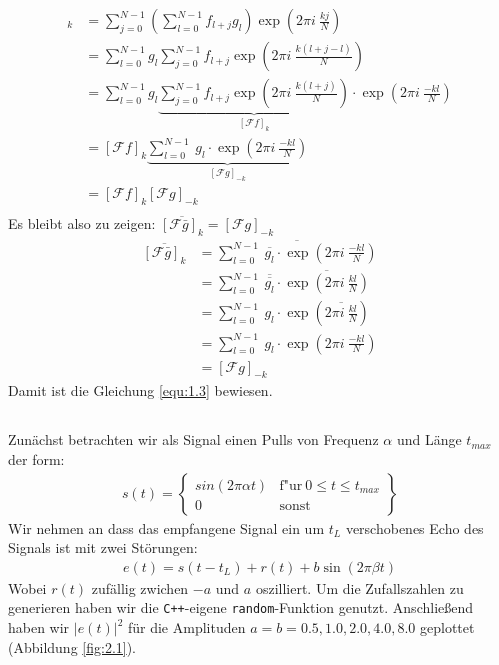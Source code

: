 \documentclass[ngerman]{scrartcl}
\begin{document}
\begin{align*}
	[\mathcal{F}(f \odot g)]_{k}
	&= \sum_{j=0}^{N-1} \left( \sum_{l=0}^{N-1} f_{l+j} g_{l} \right)  \exp (2 \pi i ~\frac{kj}{N})\\
	&= \sum_{l=0}^{N-1} g_l \sum_{j=0}^{N-1} f_{l+j} \exp (2 \pi i ~\frac{k(l+j-l)}{N})\\
	&= \sum_{l=0}^{N-1} g_l \underbrace{\sum_{j=0}^{N-1} f_{l+j} \exp (2 \pi i ~\frac{k(l+j)}{N})}_{[\mathcal{F} f]_{k}} \cdot \exp (2 \pi i ~\frac{-kl}{N})\\
	&= [\mathcal{F} f]_{k} \underbrace{\sum_{l=0}^{N-1} ~ g_l \cdot \exp (2 \pi i ~\frac{-kl}{N})}_{[\mathcal{F} g]_{-k}}\\
	&= [\mathcal{F} f]_{k} [\mathcal{F} g]_{-k}\\
\end{align*}
Es bleibt also zu zeigen:
$\overline{[\mathcal{F} \bar{g}]_{k}}=[\mathcal{F} g]_{-k}$
\begin{align*}
	\overline{[\mathcal{F} \bar{g}]_{k}} &=\overline{\sum_{l=0}^{N-1} ~ \overline{g_l} \cdot \exp (2 \pi i ~\frac{-kl}{N})}\\
	&= \sum_{l=0}^{N-1} ~ \overline{\overline{g_l}} \cdot \overline{\exp (2 \pi i ~\frac{kl}{N})}\\
	&= \sum_{l=0}^{N-1} ~ g_l \cdot \exp (\overline{2 \pi i ~\frac{kl}{N}})\\
	&= \sum_{l=0}^{N-1} ~ g_l \cdot \exp (2 \pi i ~\frac{-kl}{N})\\
	&=[\mathcal{F} g]_{-k}
\end{align*}
Damit ist die Gleichung \ref{equ:1.3} bewiesen.
\subsection{}
\label{ssec:10.2}
Zunächst betrachten wir als Signal einen Pulls
von Frequenz $\alpha$ und L\"ange $t_{max}$ der form:
\begin{align}
	s(t)=\left\{\begin{matrix}sin(2\pi \alpha t) & \text{f"ur} \ 0\leq t\leq t_{max}\\ 0 & \text{sonst} \end{matrix}\right\}
\end{align}
Wir nehmen an dass das empfangene Signal ein um  $t_L$
verschobenes Echo des Signals ist mit zwei St\"orungen:
\begin{align}
	e(t)=s\left(t-t_{L}\right)+r(t)+b \sin (2 \pi \beta t)
\end{align}
Wobei $r(t)$ zuf\"allig zwichen $-a$ und $a$ oszilliert.
Um die Zufallszahlen zu generieren haben wir die \verb|C++|-eigene
\verb|random|-Funktion genutzt.
Anschließend haben wir $|e(t)|^2$
für die Amplituden $a=b=0.5, 1.0, 2.0, 4.0, 8.0$ geplottet (Abbildung \ref{fig:2.1}).
\end{document}
